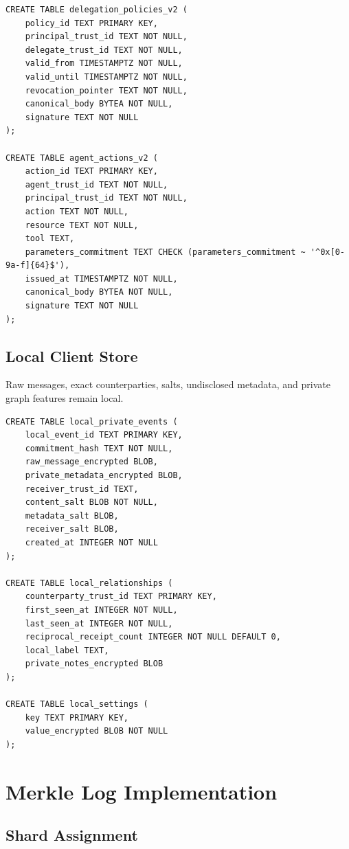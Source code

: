 \documentclass[11pt]{article}
\begin{document}
\begin{lstlisting}[style=tslcode]
CREATE TABLE delegation_policies_v2 (
    policy_id TEXT PRIMARY KEY,
    principal_trust_id TEXT NOT NULL,
    delegate_trust_id TEXT NOT NULL,
    valid_from TIMESTAMPTZ NOT NULL,
    valid_until TIMESTAMPTZ NOT NULL,
    revocation_pointer TEXT NOT NULL,
    canonical_body BYTEA NOT NULL,
    signature TEXT NOT NULL
);

CREATE TABLE agent_actions_v2 (
    action_id TEXT PRIMARY KEY,
    agent_trust_id TEXT NOT NULL,
    principal_trust_id TEXT NOT NULL,
    action TEXT NOT NULL,
    resource TEXT NOT NULL,
    tool TEXT,
    parameters_commitment TEXT CHECK (parameters_commitment ~ '^0x[0-9a-f]{64}$'),
    issued_at TIMESTAMPTZ NOT NULL,
    canonical_body BYTEA NOT NULL,
    signature TEXT NOT NULL
);
\end{lstlisting}

\subsection{Local Client Store}

Raw messages, exact counterparties, salts, undisclosed metadata, and private graph features remain local.

\begin{lstlisting}[style=tslcode]
CREATE TABLE local_private_events (
    local_event_id TEXT PRIMARY KEY,
    commitment_hash TEXT NOT NULL,
    raw_message_encrypted BLOB,
    private_metadata_encrypted BLOB,
    receiver_trust_id TEXT,
    content_salt BLOB NOT NULL,
    metadata_salt BLOB,
    receiver_salt BLOB,
    created_at INTEGER NOT NULL
);

CREATE TABLE local_relationships (
    counterparty_trust_id TEXT PRIMARY KEY,
    first_seen_at INTEGER NOT NULL,
    last_seen_at INTEGER NOT NULL,
    reciprocal_receipt_count INTEGER NOT NULL DEFAULT 0,
    local_label TEXT,
    private_notes_encrypted BLOB
);

CREATE TABLE local_settings (
    key TEXT PRIMARY KEY,
    value_encrypted BLOB NOT NULL
);
\end{lstlisting}

\section{Merkle Log Implementation}

\subsection{Shard Assignment}
\end{document}
